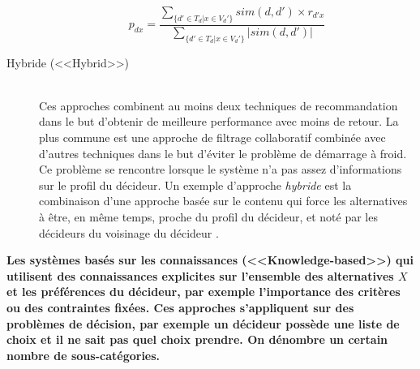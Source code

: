 \documentclass[a4paper, 11pt]{article}
\renewcommand{\textbf}[1]{\begingroup\bfseries\mathversion{bold}#1\endgroup}
\begin{document}
\begin{description}
\begin{equation}
 p_{dx} = \frac{\sum_{\{d'\in T_d | x \in V_d'\}} sim(d,d') \times r_{d'x} } {\sum_{\{d'\in T_d | x \in V_d'\}} |sim(d,d')| }
\end{equation}

\item [Hybride (<<Hybrid>>)] \hfill \\
Ces approches combinent au moins deux techniques de recommandation dans le but d'obtenir de meilleure performance avec moins de retour. La plus commune est  une approche de filtrage collaboratif combinée avec d'autres techniques dans le but d'éviter le problème de démarrage à froid. Ce problème se rencontre lorsque le système n'a pas assez d'informations sur le profil du décideur. Un exemple d'approche \textit{hybride} est la combinaison d'une approche basée sur le contenu qui force les alternatives à être, en même temps, proche du profil du décideur, et noté par les décideurs du voisinage du décideur \textcolor{blue}{\citep{Balabanovic1997}}.\\
\end{description}

\noindent \textbf{Les systèmes basés sur les connaissances (<<Knowledge-based>>)} qui utilisent des connaissances explicites sur l'ensemble des alternatives $X$ et les préférences du décideur, par exemple l'importance des critères ou des contraintes fixées. Ces approches s'appliquent sur des problèmes de décision, par exemple un décideur possède une liste de choix et il ne sait pas quel choix prendre. On dénombre un certain nombre de sous-catégories.\\

\end{document}
